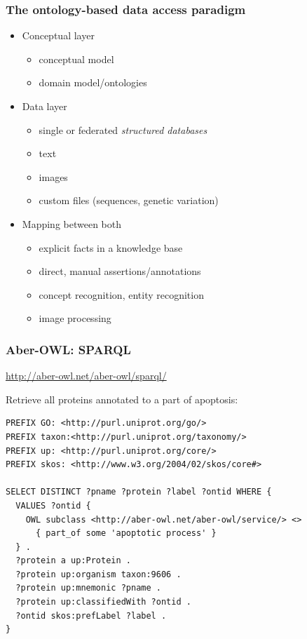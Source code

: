 \documentclass{beamer}
\renewcommand{\em}{\itshape}
\begin{document}
\begin{frame}
  \frametitle{The ontology-based data access paradigm}
  \begin{itemize}
  \item<1> Conceptual layer
    \begin{itemize}
    \item conceptual model
    \item domain model/ontologies
    \end{itemize}
  \item<2> Data layer
    \begin{itemize}
    \item single or federated {\em structured databases}
    \item text
    \item images
    \item custom files (sequences, genetic variation)
    \end{itemize}
  \item<3,4> Mapping between both
    \begin{itemize}
    \item<3,4> explicit facts in a knowledge base
    \item<3,4> direct, manual assertions/annotations
    \item<3> concept recognition, entity recognition
    \item<3> image processing
    \end{itemize}
  \end{itemize}
\end{frame}

\begin{frame}[fragile]
  \frametitle{Aber-OWL: SPARQL}
  \centerline{\url{http://aber-owl.net/aber-owl/sparql/}}
  \vspace{1cm}
  Retrieve all proteins annotated to a part of apoptosis:
  {\tiny
\begin{verbatim}
PREFIX GO: <http://purl.uniprot.org/go/>
PREFIX taxon:<http://purl.uniprot.org/taxonomy/>
PREFIX up: <http://purl.uniprot.org/core/>
PREFIX skos: <http://www.w3.org/2004/02/skos/core#>

SELECT DISTINCT ?pname ?protein ?label ?ontid WHERE { 
  VALUES ?ontid { 
    OWL subclass <http://aber-owl.net/aber-owl/service/> <>
      { part_of some 'apoptotic process' }
  } . 
  ?protein a up:Protein .
  ?protein up:organism taxon:9606 .
  ?protein up:mnemonic ?pname .
  ?protein up:classifiedWith ?ontid .
  ?ontid skos:prefLabel ?label .
}
\end{verbatim}
}
\end{frame}
\end{document}
